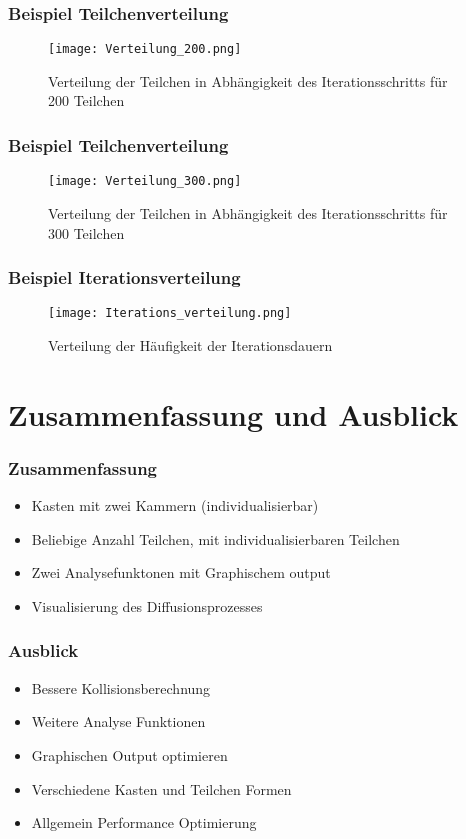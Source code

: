 \documentclass{beamer}
\begin{document}
\begin{frame} %
  \frametitle{Beispiel Teilchenverteilung} %
  \begin{figure}
		\centering
		\texttt{[image: Verteilung\_200.png]}
		\caption{Verteilung der Teilchen in Abhängigkeit des Iterationsschritts für 200 Teilchen}
  \end{figure}
\end{frame}

\begin{frame} %
  \frametitle{Beispiel Teilchenverteilung} %
  \begin{figure}
		\centering
		\texttt{[image: Verteilung\_300.png]}
		\caption{Verteilung der Teilchen in Abhängigkeit des Iterationsschritts für 300 Teilchen}
  \end{figure}
\end{frame}

\begin{frame} %
  \frametitle{Beispiel Iterationsverteilung} %
  \begin{figure}
		\centering
		\texttt{[image: Iterations\_verteilung.png]}
		\caption{Verteilung der Häufigkeit der Iterationsdauern}
  \end{figure}
\end{frame}

\section{Zusammenfassung und Ausblick}

\begin{frame} %
  \frametitle{Zusammenfassung} %
  \begin{itemize}
  	\item Kasten mit zwei Kammern (individualisierbar)
  	\item Beliebige Anzahl Teilchen, mit individualisierbaren Teilchen
  	\item Zwei Analysefunktonen mit Graphischem output
  	\item Visualisierung des Diffusionsprozesses 
  \end{itemize}
\end{frame}

\begin{frame} %
  \frametitle{Ausblick} %
  \begin{itemize}
  	\item Bessere Kollisionsberechnung
  	\item Weitere Analyse Funktionen
  	\item Graphischen Output optimieren
  	\item Verschiedene Kasten und Teilchen Formen
  	\item Allgemein Performance  Optimierung
  \end{itemize}
\end{frame}
\end{document}
